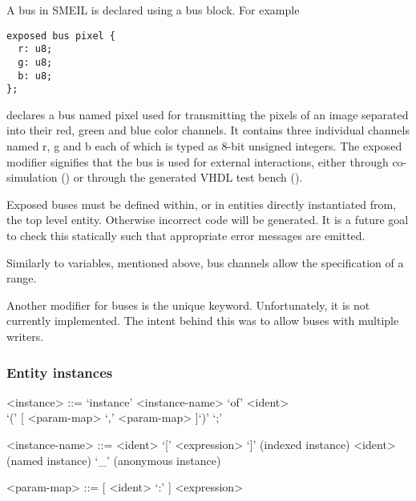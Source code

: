 A bus in SMEIL is declared using a {\ttfamily bus} block. For example
\begin{lstlisting}[language=smeil]
exposed bus pixel {
  r: u8;
  g: u8;
  b: u8;
};
\end{lstlisting}
declares a bus named {\ttfamily pixel} used for transmitting the pixels of an
image separated into their red, green and blue color channels. It contains three
individual channels named {\ttfamily r}, {\ttfamily g} and {\ttfamily b} each of
which is typed as 8-bit unsigned integers. The {\ttfamily exposed} modifier
signifies that the bus is used for external interactions, either through
co-simulation () or through the generated VHDL test bench
().

Exposed buses must be defined within, or in entities directly instantiated from,
the top level entity. Otherwise incorrect code will be generated. It is a future
goal to check this statically such that appropriate error messages are emitted.

Similarly to variables, mentioned above, bus channels allow the specification of
a {\ttfamily range}.

Another modifier for buses is the {\ttfamily unique} keyword. Unfortunately, it
is not currently implemented. The intent behind this was to allow buses with
multiple writers. 



\subsubsection{Entity instances}
\label{sec:instance}
\begin{grammar}
  <instance> ::= `instance' <instance-name> `of' <ident> \\`(' [ <param-map> { `,' <param-map> } ]`)' `;'

  <instance-name> ::= <ident> `[' <expression> `]' (indexed instance)
  \alt <ident> (named instance)
  \alt `_' (anonymous instance)

  <param-map> ::= [ <ident> `:' ] <expression>

\end{grammar}

